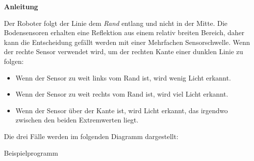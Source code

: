\textbf{Anleitung}

Der Roboter folgt der Linie dem \emph{Rand} entlang und nicht in der Mitte. Die Bodensensoren erhalten eine Reflektion aus einem relativ breiten Bereich, daher kann die Entscheidung gefällt werden mit einer Mehrfachen Sensorschwelle. Wenn der rechte Sensor verwendet wird, um der rechten Kante einer dunklen Linie zu folgen:
\begin{itemize}
	\item Wenn der Sensor zu weit links vom Rand ist, wird wenig Licht erkannt.
	\item Wenn der Sensor zu weit rechts vom Rand ist, wird viel Licht erkannt. 
	\item Wenn der Sensor über der Kante ist, wird Licht erkannt, das irgendwo zwischen den beiden Extremwerten liegt. 
\end{itemize}
Die drei Fälle werden im folgenden Diagramm dargestellt:
\begin{center}
\end{center}

\bigskip

{\raggedleft \hfill Beispielprogramm }